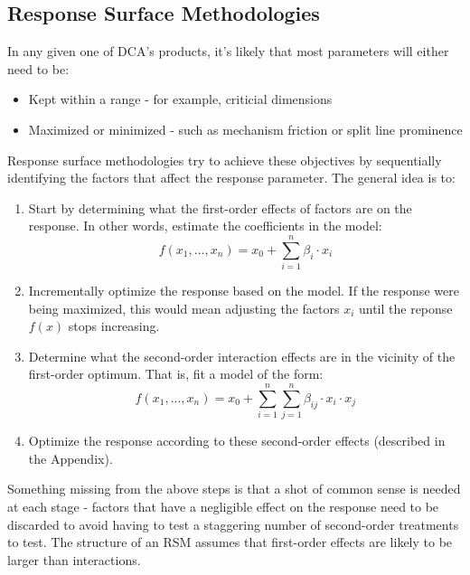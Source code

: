 \documentclass[11pt,a4paper,article]{memoir} %
\begin{document}
\subsection*{Response Surface Methodologies}
In any given one of DCA's products, it's likely that most parameters will either need to be:
\begin{itemize}
	\item Kept within a range - for example, criticial dimensions
	\item Maximized or minimized - such as mechanism friction or split line prominence
\end{itemize}
Response surface methodologies try to achieve these objectives by sequentially identifying the factors that affect the response parameter. The general idea is to:
\begin{enumerate}
\item Start by determining what the first-order effects of factors are on the response. In other words, estimate the coefficients in the model:
\begin{equation}
	f(x_1, ..., x_n) = x_0 + \sum_{i = 1}^n \beta_i \cdot x_i
\end{equation}
\item Incrementally optimize the response based on the model. If the response were being maximized, this would mean adjusting the factors $x_i$ until the reponse $f(x)$ stops increasing. 
\item Determine what the second-order interaction effects are in the vicinity of the first-order optimum. That is, fit a model of the form:
\begin{equation}
	f(x_1, ..., x_n) = x_0 + \sum_{i = 1}^n \sum_{j = 1}^n \beta_{ij}\cdot x_i \cdot x_j
\end{equation}
\item Optimize the response according to these second-order effects (described in the Appendix).
\end{enumerate}
Something missing from the above steps is that a shot of common sense is needed at each stage - factors that have a negligible effect on the response need to be discarded to avoid having to test a staggering number of second-order treatments to test. The structure of an RSM assumes that first-order effects are likely to be larger than interactions. 
\end{document}
